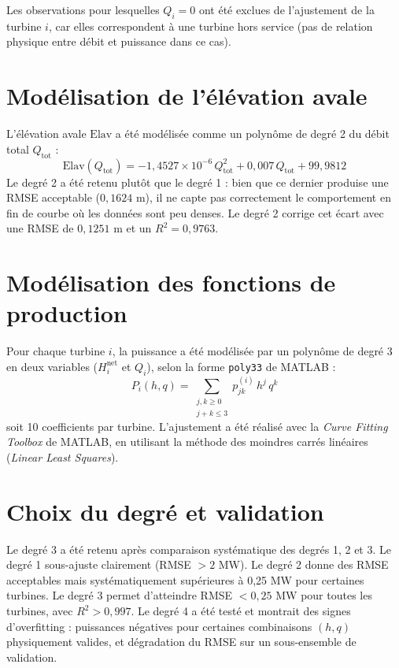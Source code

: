 \documentclass[12pt, letterpaper]{report}
\begin{document}
Les observations pour lesquelles $Q_i = 0$ ont été exclues de l'ajustement de la turbine $i$, car elles correspondent à une turbine hors service (pas de relation physique entre débit et puissance dans ce cas).

\section{Modélisation de l'élévation avale}

L'élévation avale $\text{Elav}$ a été modélisée comme un polynôme de degré 2 du débit total $Q_{\text{tot}}$ :
\begin{equation}
  \text{Elav}(Q_{\text{tot}}) = -1{,}4527 \times 10^{-6}\, Q_{\text{tot}}^2 + 0{,}007\, Q_{\text{tot}} + 99{,}9812
  \label{eq:elav}
\end{equation}
Le degré 2 a été retenu plutôt que le degré 1 : bien que ce dernier produise une RMSE acceptable ($0{,}1624$ m), il ne capte pas correctement le comportement en fin de courbe où les données sont peu denses. Le degré 2 corrige cet écart avec une RMSE de $0{,}1251$ m et un $R^2 = 0{,}9763$.

\section{Modélisation des fonctions de production}

Pour chaque turbine $i$, la puissance a été modélisée par un polynôme de degré 3 en deux variables ($H_i^{\text{net}}$ et $Q_i$), selon la forme \texttt{poly33} de MATLAB :
\begin{equation}
  P_i(h, q) = \sum_{\substack{j,k \geq 0 \\ j+k \leq 3}} p_{jk}^{(i)}\, h^j\, q^k
  \label{eq:poly33}
\end{equation}
soit 10 coefficients par turbine. L'ajustement a été réalisé avec la \textit{Curve Fitting Toolbox} de MATLAB, en utilisant la méthode des moindres carrés linéaires (\textit{Linear Least Squares}).

\section{Choix du degré et validation}

Le degré 3 a été retenu après comparaison systématique des degrés 1, 2 et 3. Le degré 1 sous-ajuste clairement (RMSE $> 2$ MW). Le degré 2 donne des RMSE acceptables mais systématiquement supérieures à 0,25 MW pour certaines turbines. Le degré 3 permet d'atteindre RMSE $< 0{,}25$ MW pour toutes les turbines, avec $R^2 > 0{,}997$. Le degré 4 a été testé et montrait des signes d'overfitting : puissances négatives pour certaines combinaisons $(h,q)$ physiquement valides, et dégradation du RMSE sur un sous-ensemble de validation.
\end{document}
